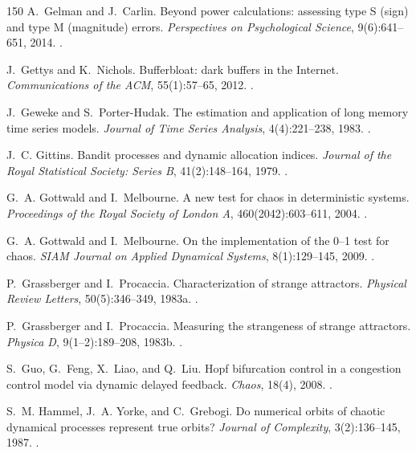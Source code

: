 \begin{thebibliography}{150}
A.~Gelman and J.~Carlin. Beyond power calculations: assessing type S (sign) and type M (magnitude) errors. \emph{Perspectives on Psychological Science}, 9(6):641--651, 2014. .

J.~Gettys and K.~Nichols. Bufferbloat: dark buffers in the Internet. \emph{Communications of the ACM}, 55(1):57--65, 2012. .

J.~Geweke and S.~Porter-Hudak. The estimation and application of long memory time series models. \emph{Journal of Time Series Analysis}, 4(4):221--238, 1983. .

J.~C. Gittins. Bandit processes and dynamic allocation indices. \emph{Journal of the Royal Statistical Society: Series B}, 41(2):148--164, 1979. .

G.~A. Gottwald and I.~Melbourne. A new test for chaos in deterministic systems. \emph{Proceedings of the Royal Society of London A}, 460(2042):603--611, 2004. .

G.~A. Gottwald and I.~Melbourne. On the implementation of the 0--1 test for chaos. \emph{SIAM Journal on Applied Dynamical Systems}, 8(1):129--145, 2009. .

P.~Grassberger and I.~Procaccia. Characterization of strange attractors. \emph{Physical Review Letters}, 50(5):346--349, 1983a. .

P.~Grassberger and I.~Procaccia. Measuring the strangeness of strange attractors. \emph{Physica D}, 9(1--2):189--208, 1983b. .

S.~Guo, G.~Feng, X.~Liao, and Q.~Liu. Hopf bifurcation control in a congestion control model via dynamic delayed feedback. \emph{Chaos}, 18(4), 2008. .

S.~M. Hammel, J.~A. Yorke, and C.~Grebogi. Do numerical orbits of chaotic dynamical processes represent true orbits? \emph{Journal of Complexity}, 3(2):136--145, 1987. .


\end{thebibliography}
